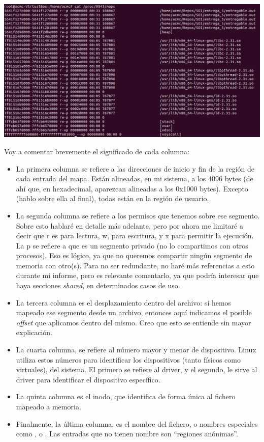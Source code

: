 \documentclass[a4paper]{article}
\begin{document}
\includegraphics[scale=0.421]{6_padre.png}

Voy a comentar brevemente el significado de cada columna:

\begin{itemize}
    \item La primera columna se refiere a las direcciones de inicio y fin de la región de cada entrada del mapa. Están alineadas, en mi sistema, a los 4096 bytes (de ahí que, en hexadecimal, aparezcan alineadas a los {\ttfamily 0x1000} bytes). Excepto {\ttfamily [vsyscall]} (hablo sobre ella al final), todas están en la región de usuario.
    \item La segunda columna se refiere a los permisos que tenemos sobre ese segmento. Sobre esto hablaré en detalle más adelante, pero por ahora me limitaré a decir que {\ttfamily r} es para lectura, {\ttfamily w}, para escritura, y {\ttfamily x} para permitir la ejecución. La {\ttfamily p} se refiere a que es un segmento privado (no lo compartimos con otros procesos). Eso es lógico, ya que no queremos compartir ningún segmento de memoria con otro(s). Para no ser redundante, no haré más referencias a esto durante mi informe, pero es relevante comentarlo, ya que podría interesar que haya secciones \emph{shared}, en determinados casos de uso.
    \item La tercera columna es el desplazamiento dentro del archivo: si hemos mapeado ese segmento desde un archivo, entonces aquí indicamos el posible \emph{offset} que aplicamos dentro del mismo. Creo que esto se entiende sin mayor explicación.
    \item La cuarta columna, se refiere al número mayor y menor de dispositivo. Linux utiliza estos números para identificar los dispositivos (tanto físicos como virtuales), del sistema. El primero se refiere al driver, y el segundo, le sirve al driver para identificar el dispositivo específico.
    \item La quinta columna es el inodo, que identifica de forma única al fichero mapeado a memoria.
    \item Finalmente, la última columna, es el nombre del fichero, o nombres especiales como {\ttfamily [stack]}, o {\ttfamily [heap]}. Las entradas que no tienen nombre son ``regiones anónimas''.
\end{itemize}
\end{document}
